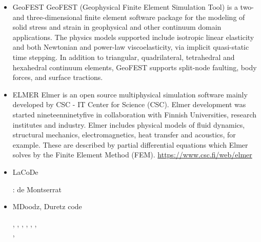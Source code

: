 \begin{itemize}
\item {\codefont GeoFEST} 
GeoFEST (Geophysical Finite Element Simulation Tool) is a two- and three-dimensional finite
element software package for the modeling of solid stress and strain in geophysical and 
other continuum domain applications.
The physics models supported include isotropic linear elasticity and both Newtonian and power-law
viscoelasticity, via implicit quasi-static time stepping. In addition to triangular, 
quadrilateral, tetrahedral and hexahedral continuum elements, GeoFEST supports split-node 
faulting, body forces, and surface tractions.


{\small
\noindent
\cite{paln08}
}

\item {\codefont ELMER} 
Elmer is an open source multiphysical simulation software mainly developed by 
CSC - IT Center for Science (CSC). Elmer development was started nineteenninetyfive in collaboration with 
Finnish Universities, research institutes and industry. Elmer includes physical models of 
fluid dynamics, structural mechanics, electromagnetics, heat transfer and acoustics, 
for example. These are described by partial differential equations which Elmer solves 
by the Finite Element Method (FEM). \url{https://www.csc.fi/web/elmer}

\cite{maierova}
\cite{mals14}

\item {\codefont LaCoDe}  

\begin{scriptsize}
\noindent
\twothousandnineteen: de Montserrat \etal \cite{demh19}
\end{scriptsize}

\item {\codefont MDoodz}, Duretz code

\begin{scriptsize}
\twothousandtwelve
\textcite{yatd12}
\twothousandthirteen
\textcite{yahb13}
\twothousandfifteen
\textcite{yadm15}
\twothousandsixteen
\textcite{dumy16}, \textcite{dupm16}
\twothousandnineteen
\textcite{chmd19}, \textcite{dual19}, \textcite{pedm19}
\twothousandtwenty
\textcite{poyd20}, \textcite{bedh20}, \textcite{chsm20}, \textcite{auwy20}\\
\twothousandtwentyone \textcite{pody21}, \textcite{cadm21}
\end{scriptsize}


\end{itemize}
